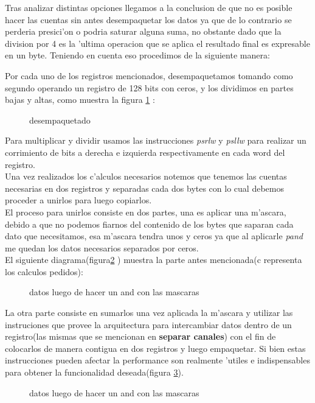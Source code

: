 Tras analizar distintas opciones llegamos a la conclusion de
que no es posible  hacer las cuentas sin antes desempaquetar los datos ya que de lo contrario se perderia
presici'on o  podria saturar alguna suma, no obstante dado que la division por 4 es la 'ultima operacion que 
se aplica el resultado final es expresable en un byte. Teniendo en cuenta eso procedimos de la siguiente 
manera: 

Por cada uno de los registros mencionados, desempaquetamos tomando como segundo operando un registro de 128
bits con ceros, y los dividimos en partes bajas y altas, como muestra la figura \ref{est:m-tres} : 

\begin{figure}[hb]
\caption{desempaquetado}
\label{est:m-tres}
\end{figure}

Para multiplicar y dividir usamos las instrucciones \textit{psrlw} y \textit{psllw} para realizar un corrimiento 
de bits a derecha e izquierda respectivamente en cada word del registro. \\
Una vez realizados los c'alculos necesarios notemos que tenemos las cuentas necesarias en dos registros
y separadas cada dos bytes con lo cual debemos proceder a unirlos para luego copiarlos. \\
El proceso para unirlos consiste en dos partes, una es aplicar una m'ascara, debido a que no podemos 
fiarnos del contenido de los bytes que saparan cada dato que necesitamos, esa m'ascara tendra unos 
y ceros ya que al aplicarle \textit{pand} me quedan los datos necesarios separados por ceros.\\
El siguiente diagrama(figura\ref{est:m-cuatro} )  muestra la parte antes mencionada(c representa los calculos pedidos):\\
\begin{figure}[hb]
\caption{datos luego de hacer un and con las mascaras}
\label{est:m-cuatro}
\end{figure}
La otra parte consiste en sumarlos una vez aplicada la m'ascara y utilizar las instruciones que provee
la arquitectura para intercambiar datos dentro de un registro(las mismas que se mencionan en
\textbf{separar canales}) con el fin de colocarlos de manera contigua en dos registros y luego empaquetar. Si bien 
estas instrucciones pueden afectar la performance son realmente  'utiles e
indispensables para obtener la funcionalidad deseada(figura \ref{est:m-cinco}).
\begin{figure}[hb]
\caption{datos luego de hacer un and con las mascaras}
\label{est:m-cinco}
\end{figure}

